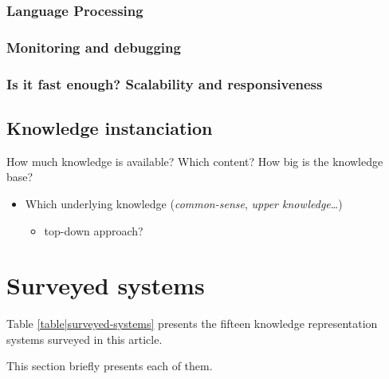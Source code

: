 \documentclass[a4paper, twocolumn]{article}
\begin{document}
\subsubsection{Language Processing}
\label{sect|nlp}

\subsubsection{Monitoring and debugging}
\label{sect|debugging}

\subsubsection{Is it fast enough? Scalability and responsiveness}
\label{sect|scalability}

\subsection{Knowledge instanciation}

How much knowledge is available? Which content? How big is the knowledge base?

\begin{itemize}
	\item  Which underlying knowledge (\emph{common-sense}, \emph{upper knowledge}\ldots{})
	\begin{itemize}
		\item  top-down approach?
	\end{itemize}

\end{itemize}



\section{Surveyed systems}
\label{sect|surveyed-systems}

Table \ref{table|surveyed-systems} presents the fifteen knowledge representation systems surveyed
in this article.

This section briefly presents each of them.
\end{document}
